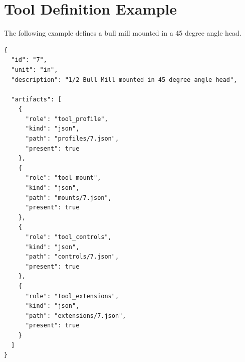 \section{Tool Definition Example}

The following example defines a bull mill mounted in a 45 degree angle head.

\begin{verbatim}
{
  "id": "7",
  "unit": "in",
  "description": "1/2 Bull Mill mounted in 45 degree angle head",

  "artifacts": [
    {
      "role": "tool_profile",
      "kind": "json",
      "path": "profiles/7.json",
      "present": true
    },
    {
      "role": "tool_mount",
      "kind": "json",
      "path": "mounts/7.json",
      "present": true
    },
    {
      "role": "tool_controls",
      "kind": "json",
      "path": "controls/7.json",
      "present": true
    },
    {
      "role": "tool_extensions",
      "kind": "json",
      "path": "extensions/7.json",
      "present": true
    }
  ]
}
\end{verbatim}
